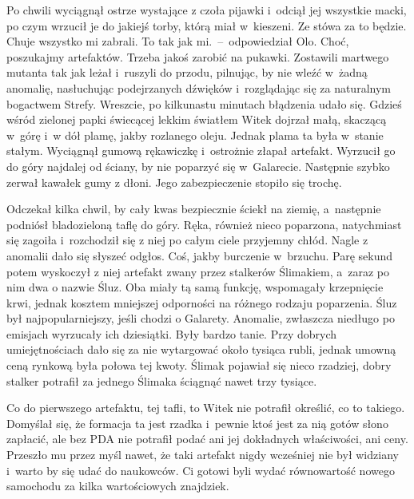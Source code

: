 \documentclass[../MAIN.tex]{subfiles}
\begin{document}
Po chwili wyciągnął ostrze wystające z czoła pijawki i~odciął jej wszystkie macki, po czym wrzucił je do jakiejś torby, którą miał w~kieszeni.
\sd
\xx Ze stówa za to będzie. Chuje wszystko mi zabrali.
\xx To tak jak mi.~--~odpowiedział Olo.
\xx Choć, poszukajmy artefaktów. Trzeba jakoś zarobić na pukawki.
\qm
Zostawili martwego mutanta tak jak leżał i~ruszyli do przodu, pilnując, by nie wleźć w~żadną anomalię, nasłuchując podejrzanych dźwięków i~rozglądając się za naturalnym bogactwem Strefy. Wreszcie, po kilkunastu minutach błądzenia udało się. Gdzieś wśród zielonej papki świecącej lekkim światłem Witek dojrzał małą, skaczącą w~górę i~w dół plamę, jakby rozlanego oleju. Jednak plama ta była w~stanie stałym. Wyciągnął gumową rękawiczkę i~ostrożnie złapał artefakt. Wyrzucił go do góry najdalej od ściany, by nie poparzyć się w~Galarecie. Następnie szybko zerwał kawałek gumy z dłoni. Jego zabezpieczenie stopiło się trochę.

Odczekał kilka chwil, by cały kwas bezpiecznie ściekł na ziemię, a~następnie podniósł bladozieloną taflę do góry. Ręka, również nieco poparzona, natychmiast się zagoiła i~rozchodził się z niej po całym ciele przyjemny chłód. Nagle z anomalii dało się słyszeć odgłos. Coś, jakby burczenie w~brzuchu. Parę sekund potem wyskoczył z niej artefakt zwany przez stalkerów Ślimakiem, a~zaraz po nim dwa o nazwie Śluz. Oba miały tą samą funkcję, wspomagały krzepnięcie krwi, jednak kosztem mniejszej odporności na różnego rodzaju poparzenia. Śluz był najpopularniejszy, jeśli chodzi o Galarety. Anomalie, zwłaszcza niedługo po emisjach wyrzucały ich dziesiątki. Były bardzo tanie. Przy dobrych umiejętnościach dało się za nie wytargować około tysiąca rubli, jednak umowną ceną rynkową była połowa tej kwoty. Ślimak pojawiał się nieco rzadziej, dobry stalker potrafił za jednego Ślimaka ściągnąć nawet trzy tysiące.

Co do pierwszego artefaktu, tej tafli, to Witek nie potrafił określić, co to takiego. Domyślał się, że formacja ta jest rzadka i~pewnie ktoś jest za nią gotów słono zapłacić, ale bez PDA nie potrafił podać ani jej dokładnych właściwości, ani ceny. Przeszło mu przez myśl nawet, że taki artefakt nigdy wcześniej nie był widziany i~warto by się udać do naukowców. Ci gotowi byli wydać równowartość nowego samochodu za kilka wartościowych znajdziek.
\end{document}

